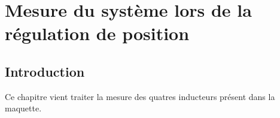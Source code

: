 \chapter{Mesure du système lors de la régulation de position}

\section{Introduction}
Ce chapitre vient traiter la mesure des quatres inducteurs présent dans la maquette.